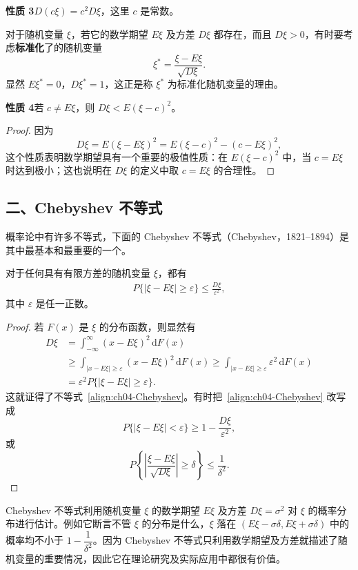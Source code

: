\documentclass[../../main.tex]{subfiles}
\begin{document}
\noindent\textbf{性质 3}\quad $D(c\xi)=c^2 D\xi$，这里 $c$ 是常数。

对于随机变量 $\xi$，若它的数学期望 $E\xi$ 及方差 $D\xi$ 都存在，而且 $D\xi>0$，有时要考虑\textbf{标准化}了的随机变量
\[
\xi^*=\frac{\xi-E\xi}{\sqrt{D\xi}}.
\]
显然 $E\xi^*=0$，$D\xi^*=1$，这正是称 $\xi^*$ 为标准化随机变量的理由。

\noindent\textbf{性质 4}\quad 若 $c\neq E\xi$，则 $D\xi<E(\xi-c)^2$。

\begin{proof}
因为
\[
D\xi=E(\xi-E\xi)^2=E(\xi-c)^2-(c-E\xi)^2,
\]
这个性质表明数学期望具有一个重要的极值性质：在 $E(\xi-c)^2$ 中，当 $c=E\xi$ 时达到极小；这也说明在 $D\xi$ 的定义中取 $c=E\xi$ 的合理性。
\end{proof}

\subsection*{二、Chebyshev 不等式}

概率论中有许多不等式，下面的 Chebyshev 不等式（Chebyshev，1821--1894）是其中最基本和最重要的一个。

\begin{theorem}\label{theorem:ch04-Chebyshev不等式}
对于任何具有有限方差的随机变量 $\xi$，都有
\begin{align}
P\{|\xi-E\xi|\geqslant\varepsilon\}\leqslant\frac{D\xi}{\varepsilon^2},\label{align:ch04-Chebyshev}
\end{align}
其中 $\varepsilon$ 是任一正数。
\end{theorem}

\begin{proof}
若 $F(x)$ 是 $\xi$ 的分布函数，则显然有
\begin{align*}
D\xi&=\int_{-\infty}^{\infty}(x-E\xi)^2\,\mathrm{d}F(x)\\
&\geqslant\int_{|x-E\xi|\geqslant\varepsilon}(x-E\xi)^2\,\mathrm{d}F(x)
\geqslant\int_{|x-E\xi|\geqslant\varepsilon}\varepsilon^2\,\mathrm{d}F(x)\\
&=\varepsilon^2 P\{|\xi-E\xi|\geqslant\varepsilon\}.
\end{align*}
这就证得了不等式~\eqref{align:ch04-Chebyshev}。有时把~\eqref{align:ch04-Chebyshev} 改写成
\[
P\{|\xi-E\xi|<\varepsilon\}\geqslant 1-\frac{D\xi}{\varepsilon^2},
\]
或
\[
P\left\{\left|\frac{\xi-E\xi}{\sqrt{D\xi}}\right|\geqslant\delta\right\}\leqslant\frac{1}{\delta^2}.
\]
\end{proof}

Chebyshev 不等式利用随机变量 $\xi$ 的数学期望 $E\xi$ 及方差 $D\xi=\sigma^2$ 对 $\xi$ 的概率分布进行估计。例如它断言不管 $\xi$ 的分布是什么，$\xi$ 落在 $(E\xi-\sigma\delta,E\xi+\sigma\delta)$ 中的概率均不小于 $1-\dfrac{1}{\delta^2}$。因为 Chebyshev 不等式只利用数学期望及方差就描述了随机变量的重要情况，因此它在理论研究及实际应用中都很有价值。
\end{document}

